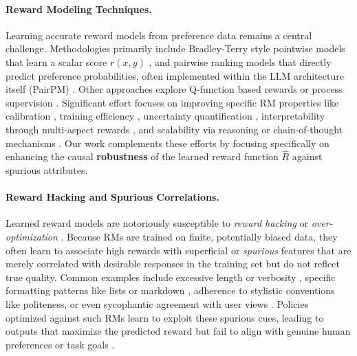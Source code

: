 \paragraph{Reward Modeling Techniques.}
Learning accurate reward models from preference data remains a central challenge. Methodologies primarily include Bradley-Terry style pointwise models that learn a scalar score $r(x, y)$ \citep{bradley1952rank, ouyang2022training, bai2022training}, and pairwise ranking models that directly predict preference probabilities, often implemented within the LLM architecture itself (PairPM) \citep{rafailov2024direct, liu2025pairwise, qin2023large}. Other approaches explore Q-function based rewards \citep{li2024process} or process supervision \citep{khalifa2025process}. Significant effort focuses on improving specific RM properties like calibration \citep{zhu2025charm, zhao2023slic}, training efficiency \citep{tunstall2023zephyr, wu2023zephyr}, uncertainty quantification \citep{lou2024uncertainty}, interpretability through multi-aspect rewards \citep{wang2024interpretable, yang2024rewards, xu2024multiaspect}, and scalability via reasoning or chain-of-thought mechanisms \citep{zhao2025genprm}. Our work complements these efforts by focusing specifically on enhancing the causal \textbf{robustness} of the learned reward function $\hat{R}$ against spurious attributes.

\paragraph{Reward Hacking and Spurious Correlations.}
Learned reward models are notoriously susceptible to \textit{reward hacking} or \textit{over-optimization} \citep{gao2023scaling, skalse2022defining, pan2022effectsrewardmisspecificationmapping}. Because RMs are trained on finite, potentially biased data, they often learn to associate high rewards with superficial or \textit{spurious} features that are merely correlated with desirable responses in the training set but do not reflect true quality. Common examples include excessive length or verbosity \citep{singhal2023long, liu2023llm}, specific formatting patterns like lists or markdown \citep{zhang2024lists, zhang2024emojis}, adherence to stylistic conventions like politeness, or even sycophantic agreement with user views \citep{denison2024sycophancy, dennison2024measuring}. Policies optimized against such RMs learn to exploit these spurious cues, leading to outputs that maximize the predicted reward but fail to align with genuine human preferences or task goals \citep{shen2023trickle}.

